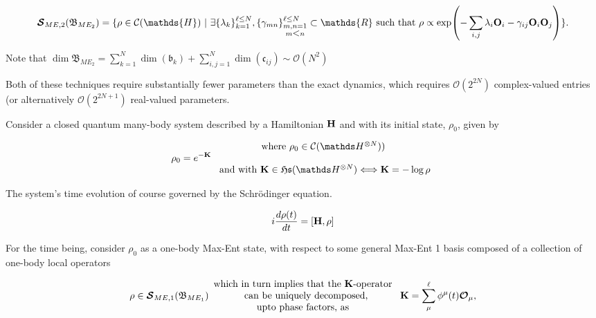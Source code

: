 \documentclass{homework}
\begin{document}
\begin{tcolorbox}[title = N\"aive two-body Max-Ent]
\begin{equation}
    \bm{\mathcal{S}}_{ME,2} (\mathfrak{B}_{ME_2}) = \{ \rho \in \mathcal{C}(\mathds{H}) \blanky | \blanky \exists \{\lambda_k\}_{k=1}^{\ell \leq N}, \{\gamma_{mn}\}_{\substack{m,n=1\\
                      {m \mbox{\textless} n}}}^{\ell \leq N} \subset \mathds{R} \textnormal{ such that }  \rho \propto \exp(-\sum_{i,j}\lambda_i {\bf O}_i - \gamma_{ij} {\bf O}_i {\bf O}_j ) \}. 
\end{equation}

Note that $\dim \mathfrak{B}_{ME_2} = \sum_{k=1}^N \dim(\mathfrak{b}_k) + \sum_{i, j=1}^N \dim(\mathfrak{c}_{ij}) \sim \mathcal{O}(N^2)$
\end{tcolorbox}

Both of these techniques require substantially fewer parameters than the exact dynamics, which requires $\mathcal{O}(2^{2N})$ complex-valued entries (or alternatively $\mathcal{O}(2^{2N + 1})$ real-valued parameters. 


\clearpage

Consider a closed quantum many-body system described by a Hamiltonian ${\bf H}$ and with its initial state, $\rho_0$, given by

$$
\rho_0 = e^{-{\bf K}} \begin{array}{c}
     \textnormal{ where $\rho_0 \in \mathcal{C}(\hilbert^{\otimes N}))$ } \\
     \\
     \textnormal{ and with ${\bf K} \in \mathfrak{H}\mathfrak{s}(\hilbert^{\otimes N})$} \Longleftrightarrow {\bf K} = - \log \rho
\end{array}
$$

The system's time evolution of course governed by the Schr\"odinger equation. 

$$
i \frac{d\rho(t)}{dt} =  [{\bf H}, \rho]
$$

For the time being, consider $\rho_0$ as a one-body Max-Ent state, with respect to some general Max-Ent 1 basis composed of a collection of one-body local operators

\begin{equation}
    \rho \in \bm{\mathcal{S}}_{ME,1}( \mathfrak{B}_{ME_1}) \begin{array}{c}
         \textnormal{which in turn implies that the ${\bf K}$-operator } \\
         \textnormal{ can be uniquely decomposed,} \\
         \textnormal{upto phase factors, as } 
    \end{array}
    {\bf K} = \sum_{\mu}^{\ell} \phi^{\mu}(t) \bm{\mathcal{O}}_{\mu},
\end{equation}
\end{document}
